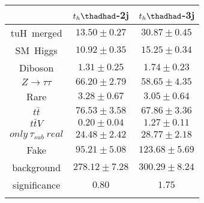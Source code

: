 \centering
\begin{tabular}{ccc} \toprule\toprule
 & $t_{h}\thadhad$-2j & $t_{h}\thadhad$-3j\\\midrule
tuH~merged & $13.50\pm0.27$ & $30.87\pm0.45$\\
SM~Higgs & $10.92\pm0.35$ & $15.25\pm0.34$\\
Diboson & $1.31\pm0.25$ & $1.74\pm0.23$\\
$Z\to\tau\tau$ & $66.20\pm2.79$ & $58.65\pm4.35$\\
Rare & $3.28\pm0.67$ & $3.05\pm0.64$\\
$t\bar{t}$ & $76.53\pm3.58$ & $67.86\pm3.36$\\
$t\bar{t}V$ & $0.20\pm0.04$ & $1.27\pm0.11$\\
$only~\tau_{sub}~real$ & $24.48\pm2.42$ & $28.77\pm2.18$\\
Fake & $95.21\pm5.08$ & $123.68\pm5.69$\\
background & $278.12\pm7.28$ & $300.29\pm8.24$\\
significance & $0.80$ & $1.75$\\
\bottomrule\bottomrule\\
\end{tabular}
